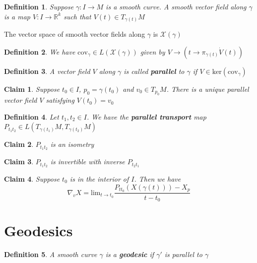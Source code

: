 \documentclass{article}
\newtheorem{definition}{Definition}
\newtheorem{claim}{Claim}
\begin{document}
\begin{definition}
    Suppose $\gamma: I \to M$ is a smooth curve. A smooth vector field along $\gamma$ is a map $V: I \to \mathbb{R}^k$ such that $V(t) \in T_{\gamma (t)}M$
\end{definition}

The vector space of smooth vector fields along $\gamma$ is $\mathcal{X}(\gamma)$

\begin{definition}
    We have  $\text{cov}_\gamma \in L(\mathcal{X}(\gamma))$ given by $V \to (t \to \pi_{\gamma(t)}\dot{V}(t))$
\end{definition}

\begin{definition}
    A vector field $V$ along $\gamma$ is called \textbf{parallel} to $\gamma$ if $V \in \text{ker} (\text{cov}_\gamma)$
\end{definition}

\begin{claim}
    Suppose $t_0 \in I$, $p_0=\gamma(t_0)$ and $v_0 \in T_{p_0}M$. There is a unique parallel vector field $V$ satisfying $V(t_0)=v_0$
\end{claim}

\begin{definition}
    Let $t_1,t_2 \in I$. We have the \textbf{parallel transport} map $P_{t_1t_2} \in L(T_{\gamma(t_1)}M,T_{\gamma(t_2)}M)$ 
\end{definition}

\begin{claim}
    $P_{t_1t_2}$ is an isometry
\end{claim}

\begin{claim}
    $P_{t_1t_2}$ is invertible with inverse $P_{t_2t_1}$
\end{claim}

\begin{claim}
    Suppose $t_0$ is in the interior of $I$. Then we have \[\nabla_vX= \text{lim}_{t \to t_0}\frac{P_{tt_0}(X(\gamma(t)))- X_p}{t-t_0}\]
\end{claim}

\section{Geodesics}

\begin{definition}
    A smooth curve $\gamma$ is a \textbf{geodesic} if $\gamma'$ is parallel to $\gamma$
\end{definition}
\end{document}
